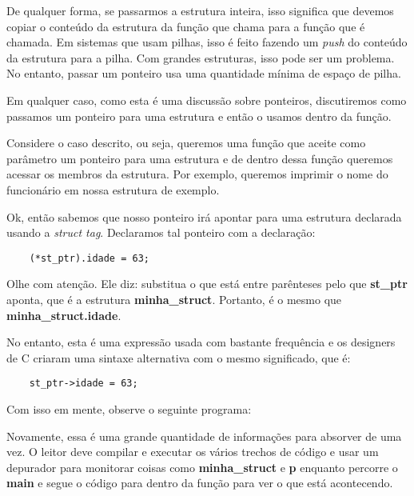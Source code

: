 De qualquer forma, se passarmos a estrutura inteira, isso significa que devemos copiar o conteúdo da estrutura da função que chama para a função que é chamada. Em sistemas que usam pilhas, isso é feito fazendo um \textit{push} do conteúdo da estrutura para a pilha. Com grandes estruturas, isso pode ser um problema. No entanto, passar um ponteiro usa uma quantidade mínima de espaço de pilha.

Em qualquer caso, como esta é uma discussão sobre ponteiros, discutiremos como passamos um ponteiro para uma estrutura e então o usamos dentro da função.

Considere o caso descrito, ou seja, queremos uma função que aceite como parâmetro um ponteiro para uma estrutura e de dentro dessa função queremos acessar os membros da estrutura. Por exemplo, queremos imprimir o nome do funcionário em nossa estrutura de exemplo.

Ok, então sabemos que nosso ponteiro irá apontar para uma estrutura declarada usando a \textit{struct tag}. Declaramos tal ponteiro com a declaração:
\begin{lstlisting}
	(*st_ptr).idade = 63;
\end{lstlisting}

Olhe com atenção. Ele diz: substitua o que está entre parênteses pelo que \textbf{st\_ptr} aponta, que é a estrutura \textbf{minha\_struct}. Portanto, é o mesmo que \textbf{minha\_struct.idade}.

No entanto, esta é uma expressão usada com bastante frequência e os designers de C criaram uma sintaxe alternativa com o mesmo significado, que é:
\begin{lstlisting}
	st_ptr->idade = 63;
\end{lstlisting}

Com isso em mente, observe o seguinte programa:


Novamente, essa é uma grande quantidade de informações para absorver de uma vez. O leitor deve compilar e executar os vários trechos de código e usar um depurador para monitorar coisas como \textbf{minha\_struct} e \textbf{p} enquanto percorre o \textbf{main} e segue o código para dentro da função para ver o que está acontecendo.